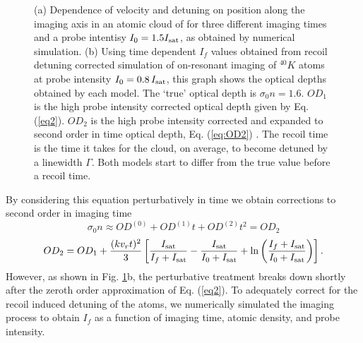 \documentclass[12pt]{iopart}
\begin{document}
\begin{figure}
\caption{(a) Dependence of velocity and detuning on position along the imaging axis in an atomic cloud of \K{} for three different imaging times and a probe intentisy $I_0=1.5 I_{\rm{sat}}$, as obtained by numerical simulation. (b) Using time dependent $I_f$ values obtained from recoil detuning corrected simulation of on-resonant imaging of $^{40}K$ atoms at probe intensity $I_0=0.8\, I_{\rm{sat}}$, this graph shows the optical depths obtained by each model. The `true' optical depth is $\sigma_0 n=1.6$. $OD_1$ is the high probe intensity corrected optical depth given by Eq. (\ref{eq2}). $OD_2$ is the high probe intensity corrected and expanded to second order in time optical depth, Eq. (\ref{eq:OD2}) \cite{LJLthesis}. The recoil time is the time it takes for the cloud, on average, to become detuned by a linewidth $\Gamma$. Both models start to differ from the true value before a recoil time.}  
\label{fig:expos}
\end{figure}
\par By considering this equation perturbatively in time we obtain corrections to second order in imaging time \cite{LJLthesis}
\begin{equation}
\sigma_0n\approx OD^{(0)}+OD^{(1)}t+OD^{(2)}t^2 = OD_2
\end{equation}
\begin{equation}
OD_2= OD_1+\frac{(kv_rt)^2}{3}\left[\frac{I_{\rm{sat}}}{I_f+I_{\rm{sat}}}-\frac{I_{\rm{sat}}}{I_0+I_{\rm{sat}}}+\mathrm{ln}\left(\frac{I_f+I_{\rm{sat}}}{I_0+I_{\rm{sat}}}\right)\right].
\label{eq:OD2}
\end{equation}
 However, as shown in  Fig. \ref{fig:expos}b, the perturbative treatment breaks down shortly after the zeroth order approximation of Eq. (\ref{eq2}). To adequately correct for the recoil induced detuning of the atoms, we numerically simulated the imaging process to obtain $I_f$ as a function of imaging time, atomic density, and probe intensity. 
\end{document}
